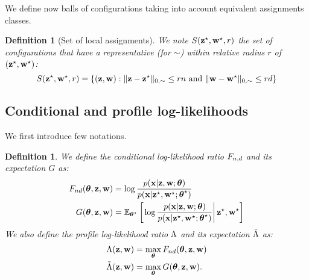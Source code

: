 \documentclass[]{imsart}
\newcommand{\1}{\mathds{1}}
\numberwithin{equation}{section}
\theoremstyle{plain}
\newtheorem{dof}[thm]{Definition}
\theoremstyle{remark}
\begin{document}
We define now balls of configurations taking into account equivalent assignments classes.
\begin{dof}[Set of local assignments]
  \label{prop:small-deviations-profile-likelihood}
  We note $S(\mathbf{z}^\star, \mathbf{w}^\star, r)$ the set of configurations that have a representative (for $\sim$) within relative radius $r$ of $(\mathbf{z}^\star, \mathbf{w}^\star)$:
  \begin{equation*}
    S(\bzs, \bws, r) = \left\{ (\bz, \bw) : \|\bz - \bzs\|_{0, \sim} \leq r \n \text{ and } \|\bw - \bws\|_{0, \sim} \leq r \dd \right\}
  \end{equation*}
\end{dof}

\subsection{Conditional and profile log-likelihoods}
\label{sec:cond-and-prof-likelihood} 
%
We first introduce few notations.

\begin{dof}
\label{def:conditional-profile-likelihood}
We define the conditional log-likelihood ratio $F_{n,d}$ and its expectation $G$ as:
\begin{equation}
  \label{eq:conditional-likelihood}
  \begin{aligned}
    \Fnd(\btheta, \bz, \bw) & = \log \frac{\prob(\bx| \bz,\bw;\btheta)}{\prob(\bx| \bzs,\bws;\bthetas)} \\
    \G(\btheta, \bz, \bw) & = \Esp_{\bthetas} \left[ \left. \log \frac{\prob(\bx| \bz,\bw;\btheta)}{\prob(\bx| \bzs,\bws;\bthetas)} \right| \bzs, \bws  \right] \\
  \end{aligned}
\end{equation}
We also define the profile log-likelihood ratio $\Lambda$ and its expectation $\tilde{\Lambda}$ as:
\begin{equation}
  \label{eq:profile-likelihood}
  \begin{aligned}
    \Lamb(\bz, \bw) & = \max_{\btheta} \Fnd(\btheta, \bz, \bw)  \\
    \Lambtilde(\bz, \bw) & = \max_{\btheta} \G(\btheta, \bz, \bw).
  \end{aligned}
\end{equation}
\end{dof}
\end{document}
